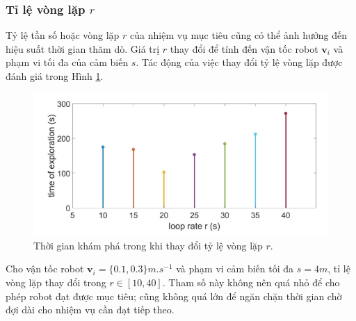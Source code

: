 \documentclass[11pt,openany]{book}
\begin{document}
\subsubsection{Tỉ lệ vòng lặp $r$}
Tỷ lệ tần số hoặc vòng lặp $r$ của nhiệm vụ mục tiêu cũng có thể ảnh hưởng đến hiệu suất thời gian thăm dò. Giá trị $r$ thay đổi để tính đến vận tốc robot $\mathbf{v}_i$ và phạm vi tối đa của cảm biến $s$. Tác động của việc thay đổi tỷ lệ vòng lặp được đánh giá trong Hình \ref{fig:3.12}.
\begin{figure}[H]
    \centering
    \includegraphics[scale=0.5]{assets/3_12.png}
    \caption{Thời gian khám phá trong khi thay đổi tỷ lệ vòng lặp $r$.}
    \label{fig:3.12}
\end{figure}
Cho vận tốc robot $\mathbf{v}_i=\{0.1,0.3\}m.s^{-1}$ và phạm vi cảm biến tối đa $s=4m$, tỉ lệ vòng lặp thay đổi trong $r \in [10,40]$. Tham số này không nên quá nhỏ để cho phép robot đạt được mục tiêu; cũng không quá lớn để ngăn chặn thời gian chờ đợi dài cho nhiệm vụ cần đạt tiếp theo.
\end{document}

